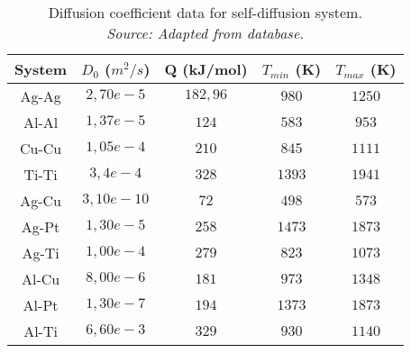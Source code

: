 \begin{table}[H]
    \centering
    \captionsetup{justification=centering}
    \begin{tabular}{ccccc}
        System & $D_0$ ($m^2/s$) & Q (kJ/mol) & $T_{min}$ (K) & $T_{max}$ (K) \\ \hline \hline
        Ag-Ag & $2,70e-5$ & $182,96$ & $980$ & $1250$\\
        Al-Al & $1,37e-5$ & $124$ & $583$ & $953$ \\
        Cu-Cu & $1,05e-4$ & $210$ & $845$ & $1111$\\
        Ti-Ti & $3,4e-4$ & $328$ & $1393$ & $1941$ \\
        Ag-Cu & $3,10e-10$ & $72$ & $498$ & $573$\\
        Ag-Pt & $1,30e-5$ & $258$ & $1473$ & $1873$\\
        Ag-Ti & $1,00e-4$ & $279$ & $823$ & $1073$ \\
        Al-Cu & $8,00e-6$ & $181$ & $973$ & $1348$ \\
        Al-Pt & $1,30e-7$ & $194$ & $1373$ & $1873$\\
        Al-Ti & $6,60e-3$ & $329$ & $930$ & $1140$
    \end{tabular}
    \caption{Diffusion coefficient data for self-diffusion system. \\
    \textit{Source: Adapted from \citep{kakusan} database.}}
    \label{tab:tabla2}
\end{table}